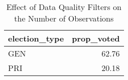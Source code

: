 \begin{table}[!htb]
\centering
\caption{Effect of Data Quality Filters on the Number of Observations} 
\label{table:pri_gen}
\begingroup\small
\begin{tabular}{lr}
  \hline
election\_type & prop\_voted \\ 
  \hline
GEN & 62.76 \\ 
  PRI & 20.18 \\ 
   \hline
\end{tabular}
\endgroup
\end{table}
